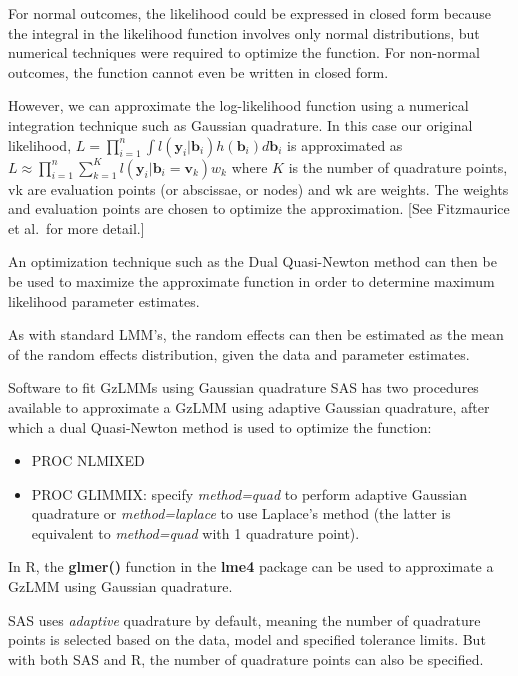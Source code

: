 \documentclass[
  9pt,
  ignorenonframetext,
]{beamer}
\begin{document}
\begin{frame}{}
\protect\hypertarget{section-2}{}
For normal outcomes, the likelihood could be expressed in closed form
because the integral in the likelihood function involves only normal
distributions, but numerical techniques were required to optimize the
function. For non-normal outcomes, the function cannot even be written
in closed form.

However, we can approximate the log-likelihood function using a
numerical integration technique such as Gaussian quadrature. In this
case our original likelihood,
\(L=\prod _{i=1}^n\int l(\pmb y_i |\pmb b_i)h(\pmb b_i)d\pmb b_i\) is
approximated as
\(L\approx \prod _{i=1}^n\sum _{k=1}^Kl(\pmb y_i |\pmb b_i=\pmb v_k)w_k\)
where \(K\) is the number of quadrature points, vk are evaluation points
(or abscissae, or nodes) and wk are weights. The weights and evaluation
points are chosen to optimize the approximation. {[}See Fitzmaurice et
al.~for more detail.{]}

An optimization technique such as the Dual Quasi-Newton method can then
be be used to maximize the approximate function in order to determine
maximum likelihood parameter estimates.

As with standard LMM's, the random effects can then be estimated as the
mean of the random effects distribution, given the data and parameter
estimates.
\end{frame}

\begin{frame}{Software to fit GzLMMs using Gaussian quadrature}
\protect\hypertarget{software-to-fit-gzlmms-using-gaussian-quadrature}{}
SAS has two procedures available to approximate a GzLMM using adaptive
Gaussian quadrature, after which a dual Quasi-Newton method is used to
optimize the function:

\begin{itemize}
\item
  PROC NLMIXED
\item
  PROC GLIMMIX: specify \emph{method=quad} to perform adaptive Gaussian
  quadrature or \emph{method=laplace} to use Laplace's method (the
  latter is equivalent to \emph{method=quad} with 1 quadrature point).
\end{itemize}

In R, the \textbf{glmer()} function in the \textbf{lme4} package can be
used to approximate a GzLMM using Gaussian quadrature.

SAS uses \emph{adaptive} quadrature by default, meaning the number of
quadrature points is selected based on the data, model and specified
tolerance limits. But with both SAS and R, the number of quadrature
points can also be specified.
\end{frame}
\end{document}

